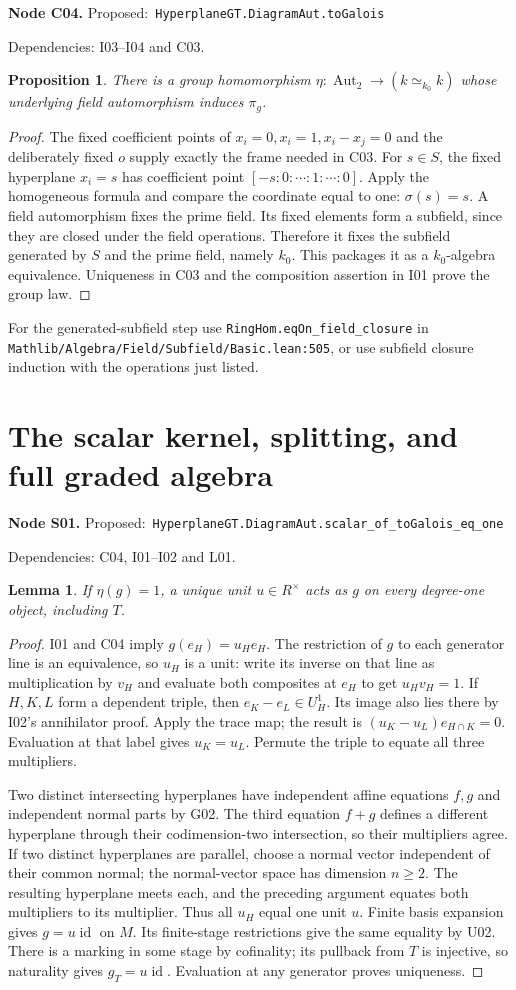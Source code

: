 \documentclass[11pt]{article}
\newtheorem{lemma}[theorem]{Lemma}
\newtheorem{proposition}[theorem]{Proposition}
\theoremstyle{remark}\newtheorem{remark}[theorem]{Remark}
\newcommand{\Aut}{\operatorname{Aut}}
\newcommand{\id}{\operatorname{id}}
\newcommand{\code}[1]{\nolinkurl{#1}}
\newcommand{\node}[3]{\par\Needspace{8\baselineskip}\smallskip\noindent\textbf{Node #1.}\quad
 \textsf{Proposed:}\ \code{#2}\par\noindent
 \textsf{Dependencies:} #3.\par\smallskip}
\begin{document}
\node{C04}{HyperplaneGT.DiagramAut.toGalois}{I03--I04 and C03}
\begin{proposition}\label{prop:c04}
There is a group homomorphism
$\eta:\Aut_2\to(k\simeq_{k_0}k)$ whose underlying field
automorphism induces $\pi_g$.
\end{proposition}
\begin{proof}
The fixed coefficient points of $x_i=0,x_i=1,x_i-x_j=0$
and the deliberately fixed $o$ supply exactly the frame needed
in C03. For $s\in S$, the fixed hyperplane $x_i=s$ has
coefficient point $[-s:0:\cdots:1:\cdots:0]$. Apply the
homogeneous formula and compare the coordinate equal to one:
$\sigma(s)=s$. A field automorphism fixes the prime field.
Its fixed elements form a subfield, since they are closed under
the field operations. Therefore it fixes the subfield generated
by $S$ and the prime field, namely $k_0$. This packages it as
a $k_0$-algebra equivalence. Uniqueness in C03 and the
composition assertion in I01 prove the group law.
\end{proof}
For the generated-subfield step use
\code{RingHom.eqOn_field_closure} in
\code{Mathlib/Algebra/Field/Subfield/Basic.lean:505}, or use
subfield closure induction with the operations just listed.

\section{The scalar kernel, splitting, and full graded algebra}

\node{S01}{HyperplaneGT.DiagramAut.scalar_of_toGalois_eq_one}{C04, I01--I02 and L01}
\begin{lemma}\label{lem:s01}
If $\eta(g)=1$, a unique unit $u\in R^\times$ acts as $g$ on
every degree-one object, including $T$.
\end{lemma}
\begin{proof}
I01 and C04 imply $g(e_H)=u_He_H$. The restriction of $g$ to
each generator line is an equivalence, so $u_H$ is a unit:
write its inverse on that line as multiplication by $v_H$ and
evaluate both composites at $e_H$ to get $u_Hv_H=1$.
If $H,K,L$ form a dependent triple, then $e_K-e_L\in U_H^1$.
Its image also lies there by I02's annihilator proof. Apply
the trace map; the result is
$(u_K-u_L)e_{H\cap K}=0$. Evaluation at that label gives
$u_K=u_L$. Permute the triple to equate all three multipliers.

Two distinct intersecting hyperplanes have independent affine
equations $f,g$ and independent normal parts by G02. The third
equation $f+g$ defines a different hyperplane through their
codimension-two intersection, so their multipliers agree. If
two distinct hyperplanes are parallel, choose a normal vector
independent of their common normal; the normal-vector space
has dimension $n\ge2$. The resulting hyperplane meets each,
and the preceding argument equates both multipliers to its
multiplier. Thus all $u_H$ equal one unit $u$. Finite basis
expansion gives $g=u\id$ on $M$. Its finite-stage restrictions
give the same equality by U02. There is a marking in some stage
by cofinality; its pullback from $T$ is injective, so naturality
gives $g_T=u\id$. Evaluation at any generator proves uniqueness.
\end{proof}
\end{document}
